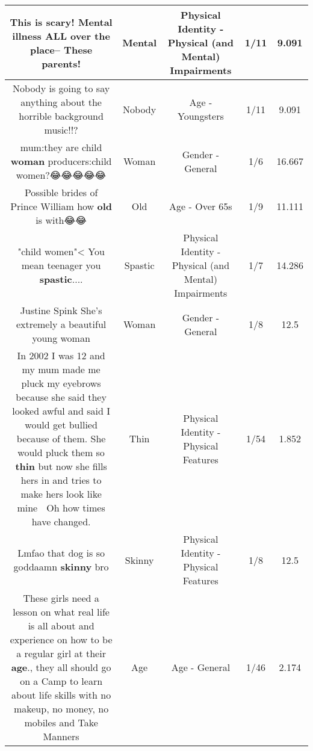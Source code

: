 \documentclass[11pt]{article}
\newlength\mylength
\begin{document}
\begin{center}
\begin{longtable}{|C{.65\mylength}|C{.30\mylength}|C{.12\mylength}|C{.12\mylength}|C{.12\mylength}|}
  \small This is scary! \textbf{Mental} illness ALL over the place-- These parents!\normalsize   & Mental & Physical Identity - Physical (and Mental) Impairments & 1/11 & 9.091 \\  \hline
  \small Nobody is going to say anything about the horrible background music!!?\normalsize   & Nobody & Age - Youngsters & 1/11 & 9.091 \\  \hline
  \small mum:they are child \textbf{woman} producers:child women?😂😂😂😂😂\normalsize   & Woman & Gender - General & 1/6 & 16.667 \\  \hline
  \small Possible brides of Prince William how \textbf{old} is with😂😂\normalsize   & Old & Age - Over 65s & 1/9 & 11.111 \\  \hline
  \small "child women"< You mean teenager you \textbf{spastic}....\normalsize   & Spastic & Physical Identity - Physical (and Mental) Impairments & 1/7 & 14.286 \\  \hline
  \small Justine Spink She's extremely a beautiful young woman\normalsize   & Woman & Gender - General & 1/8 & 12.5 \\  \hline
  \small In 2002 I was 12 and my mum made me pluck my eyebrows because she said they looked awful and said I would get bullied because of them. She would pluck them so \textbf{thin} but now she fills hers in and tries to make hers look like mine 🙂 Oh how times have changed.\normalsize   & Thin & Physical Identity - Physical Features & 1/54 & 1.852 \\  \hline
  \small Lmfao that dog is so goddaamn \textbf{skinny} bro\normalsize   & Skinny & Physical Identity - Physical Features & 1/8 & 12.5 \\  \hline
  \small These girls need a lesson on what real life is all about and experience on how to be a regular girl at their \textbf{age}., they all should go on a Camp to learn about life skills with no makeup, no money, no mobiles and Take Manners\normalsize   & Age & Age - General & 1/46 & 2.174 \\  \hline

\end{longtable}
\end{center}
\end{document}
